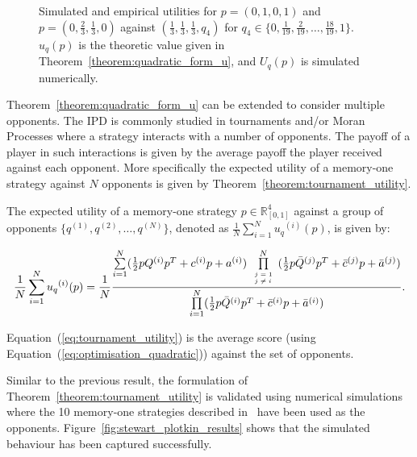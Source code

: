 \begin{figure}[!htbp]
\begin{center}
\begin{subfigure}{0.45\textwidth}
        \end{subfigure}
    \end{center}
    \caption{Simulated and empirical utilities for \(p = (0, 1, 0, 1)\)
    and \(p = (0, \frac{2}{3}, \frac{1}{3}, 0)\) against \((\frac{1}{3}, \frac{1}{3}, \frac{1}{3}, q_4)\) for
    \(q_4 \in \{0,  \frac{1}{19}, \frac{2}{19}, \dots, \frac{18}{19}, 1\}\).
    \(u_q(p)\) is the theoretic value given in Theorem~\ref{theorem:quadratic_form_u},
    and \(U_q(p)\) is simulated numerically.}
    \label{fig:analytical_simulated}
\end{figure}

Theorem~\ref{theorem:quadratic_form_u} can be extended to consider multiple
opponents. The IPD is commonly studied in tournaments and/or Moran Processes
where a strategy interacts with a number of opponents. The payoff of a player in
such interactions is given by the average payoff the player received against
each opponent. More specifically the expected utility of a memory-one strategy
against \(N\) opponents is given by Theorem~\ref{theorem:tournament_utility}.

\begin{theorem}\label{theorem:tournament_utility}
    The expected utility of a memory-one strategy \(p\in\mathbb{R}_{[0,1]}^4\)
    against a group of opponents \(\{q^{(1)}, q^{(2)}, \dots, q^{(N)}\}\), denoted
    as \(\frac{1}{N} \sum\limits_{i=1} ^ {N} {u_q}^{(i)} (p)\), is given by:

    \begin{equation}\label{eq:tournament_utility}
        \frac{1}{N} \sum\limits_{i=1} ^ {N} {u_q}^{(i)} (p) = \frac{1}{N}
        \frac{\sum\limits_{i=1} ^ {N} (\frac{1}{2} pQ^{(i)} p^T + c^{(i)} p + a^ {(i)})
        \prod\limits_{\tiny\begin{array}{l} j=1 \\ j \neq i \end{array}} ^
        N (\frac{1}{2} p\bar{Q}^{(j)} p^T + \bar{c}^{(j)} p + \bar{a}^ {(j)})}
        {\prod\limits_{i=1} ^ N (\frac{1}{2} p\bar{Q}^{(i)} p^T + \bar{c}^{(i)} p + \bar{a}^ {(i)})}.
    \end{equation}
\end{theorem}

Equation~(\ref{eq:tournament_utility}) is the average score
(using Equation~(\ref{eq:optimisation_quadratic})) against the set of opponents.

Similar to the previous result, the formulation of
Theorem~\ref{theorem:tournament_utility} is validated using numerical
simulations where the 10 memory-one strategies described in~\cite{Stewart2012}
have been used as the opponents. Figure~\ref{fig:stewart_plotkin_results} shows
that the simulated behaviour has been captured successfully.

